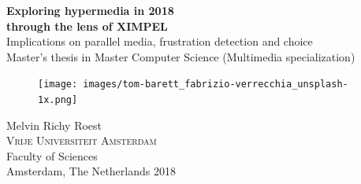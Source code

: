 
\begin{titlepage}
			
\addtolength{\voffset}{1.5cm}

\renewcommand{\familydefault}{\sfdefault} \normalfont %
\textbf{{\Huge 	Exploring hypermedia in 2018 	\\[0.2cm]
				through the lens of XIMPEL}} 	\\[0.5cm]
{\Large Implications on parallel media, frustration detection and choice}\\[0.5cm]
Master's thesis in Master Computer Science (Multimedia specialization) 


\begin{figure}[H]
\centering
\texttt{[image: images/tom-barett\_fabrizio-verrecchia\_unsplash-1x.png]}
\end{figure}

\vspace{-1.5cm}
{\large{Melvin Richy Roest}}
\vspace{1cm}\\
\textsc{Vrije Universiteit Amsterdam} \\
Faculty of Sciences\\ 
Amsterdam, The Netherlands 2018

\renewcommand{\familydefault}{\rmdefault} \normalfont %

\end{titlepage}


\newpage
\restoregeometry
\thispagestyle{empty}
\mbox{}


